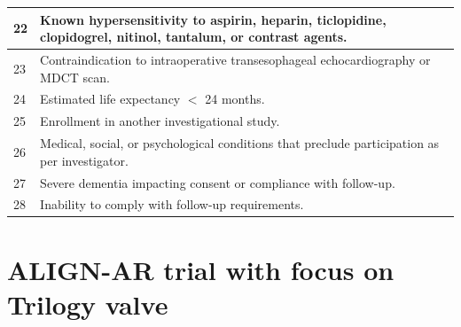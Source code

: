 \documentclass[nols]{tufte-book}
\begin{document}
\begin{longtable}{p{}p{}}
22 & Known hypersensitivity to aspirin, heparin, ticlopidine, clopidogrel, nitinol, tantalum, or contrast agents. \\ \hline
23 & Contraindication to intraoperative transesophageal echocardiography or MDCT scan. \\ \hline
24 & Estimated life expectancy $<$ 24 months. \\ \hline
25 & Enrollment in another investigational study. \\ \hline
26 & Medical, social, or psychological conditions that preclude participation as per investigator. \\ \hline
27 & Severe dementia impacting consent or compliance with follow-up. \\ \hline
28 & Inability to comply with follow-up requirements. \\ \hline

\end{longtable}


\section{ALIGN-AR trial with focus on Trilogy valve}
\end{document}
